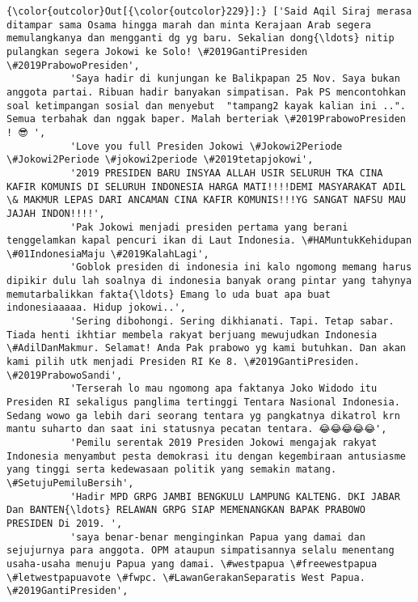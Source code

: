 \documentclass[11pt]{article}
\begin{document}
\begin{Verbatim}[commandchars=\\\{\}]
{\color{outcolor}Out[{\color{outcolor}229}]:} ['Said Aqil Siraj merasa ditampar sama Osama hingga marah dan minta Kerajaan Arab segera memulangkanya dan mengganti dg yg baru. Sekalian dong{\ldots} nitip pulangkan segera Jokowi ke Solo! \#2019GantiPresiden \#2019PrabowoPresiden',
           'Saya hadir di kunjungan ke Balikpapan 25 Nov. Saya bukan anggota partai. Ribuan hadir banyakan simpatisan. Pak PS mencontohkan soal ketimpangan sosial dan menyebut  "tampang2 kayak kalian ini ..". Semua terbahak dan nggak baper. Malah berteriak \#2019PrabowoPresiden ! 😎 ',
           'Love you full Presiden Jokowi \#Jokowi2Periode \#Jokowi2Periode \#jokowi2periode \#2019tetapjokowi',
           '2019 PRESIDEN BARU INSYAA ALLAH USIR SELURUH TKA CINA KAFIR KOMUNIS DI SELURUH INDONESIA HARGA MATI!!!!DEMI MASYARAKAT ADIL \& MAKMUR LEPAS DARI ANCAMAN CINA KAFIR KOMUNIS!!!YG SANGAT NAFSU MAU JAJAH INDON!!!!',
           'Pak Jokowi menjadi presiden pertama yang berani tenggelamkan kapal pencuri ikan di Laut Indonesia. \#HAMuntukKehidupan \#01IndonesiaMaju \#2019KalahLagi',
           'Goblok presiden di indonesia ini kalo ngomong memang harus dipikir dulu lah soalnya di indonesia banyak orang pintar yang tahynya memutarbalikkan fakta{\ldots} Emang lo uda buat apa buat indonesiaaaaa. Hidup jokowi..',
           'Sering dibohongi. Sering dikhianati. Tapi. Tetap sabar. Tiada henti ikhtiar membela rakyat berjuang mewujudkan Indonesia \#AdilDanMakmur. Selamat! Anda Pak prabowo yg kami butuhkan. Dan akan kami pilih utk menjadi Presiden RI Ke 8. \#2019GantiPresiden. \#2019PrabowoSandi',
           'Terserah lo mau ngomong apa faktanya Joko Widodo itu Presiden RI sekaligus panglima tertinggi Tentara Nasional Indonesia. Sedang wowo ga lebih dari seorang tentara yg pangkatnya dikatrol krn mantu suharto dan saat ini statusnya pecatan tentara. 😂😂😂😂😂',
           'Pemilu serentak 2019 Presiden Jokowi mengajak rakyat Indonesia menyambut pesta demokrasi itu dengan kegembiraan antusiasme yang tinggi serta kedewasaan politik yang semakin matang. \#SetujuPemiluBersih',
           'Hadir MPD GRPG JAMBI BENGKULU LAMPUNG KALTENG. DKI JABAR Dan BANTEN{\ldots} RELAWAN GRPG SIAP MEMENANGKAN BAPAK PRABOWO PRESIDEN Di 2019. ',
           'saya benar-benar menginginkan Papua yang damai dan sejujurnya para anggota. OPM ataupun simpatisannya selalu menentang usaha-usaha menuju Papua yang damai. \#westpapua \#freewestpapua \#letwestpapuavote \#fwpc. \#LawanGerakanSeparatis West Papua. \#2019GantiPresiden',

\end{Verbatim}
\end{document}
